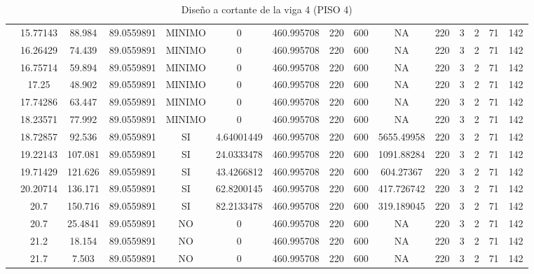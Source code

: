 \begin{table}[H]
{\begin{tabular}{|c|c|c|c|c|c|c|c|c|c|c|c|c|c|c|}
\cline{2-15}    & 15.77143 & 88.984 & 89.0559891 & MINIMO & 0   & 460.995708 & 220 & 600 & NA  & 220 & 3   & 2   & 71  & 142 \bigstrut\\
\cline{2-15}    & 16.26429 & 74.439 & 89.0559891 & MINIMO & 0   & 460.995708 & 220 & 600 & NA  & 220 & 3   & 2   & 71  & 142 \bigstrut\\
\cline{2-15}    & 16.75714 & 59.894 & 89.0559891 & MINIMO & 0   & 460.995708 & 220 & 600 & NA  & 220 & 3   & 2   & 71  & 142 \bigstrut\\
\cline{2-15}    & 17.25 & 48.902 & 89.0559891 & MINIMO & 0   & 460.995708 & 220 & 600 & NA  & 220 & 3   & 2   & 71  & 142 \bigstrut\\
\cline{2-15}    & 17.74286 & 63.447 & 89.0559891 & MINIMO & 0   & 460.995708 & 220 & 600 & NA  & 220 & 3   & 2   & 71  & 142 \bigstrut\\
\cline{2-15}    & 18.23571 & 77.992 & 89.0559891 & MINIMO & 0   & 460.995708 & 220 & 600 & NA  & 220 & 3   & 2   & 71  & 142 \bigstrut\\
\cline{2-15}    & 18.72857 & 92.536 & 89.0559891 & SI  & 4.64001449 & 460.995708 & 220 & 600 & 5655.49958 & 220 & 3   & 2   & 71  & 142 \bigstrut\\
\cline{2-15}    & 19.22143 & 107.081 & 89.0559891 & SI  & 24.0333478 & 460.995708 & 220 & 600 & 1091.88284 & 220 & 3   & 2   & 71  & 142 \bigstrut\\
\cline{2-15}    & 19.71429 & 121.626 & 89.0559891 & SI  & 43.4266812 & 460.995708 & 220 & 600 & 604.27367 & 220 & 3   & 2   & 71  & 142 \bigstrut\\
\cline{2-15}    & 20.20714 & 136.171 & 89.0559891 & SI  & 62.8200145 & 460.995708 & 220 & 600 & 417.726742 & 220 & 3   & 2   & 71  & 142 \bigstrut\\
\cline{2-15}    & 20.7 & 150.716 & 89.0559891 & SI  & 82.2133478 & 460.995708 & 220 & 600 & 319.189045 & 220 & 3   & 2   & 71  & 142 \bigstrut\\
\cline{2-15}    & 20.7 & 25.4841 & 89.0559891 & NO  & 0   & 460.995708 & 220 & 600 & NA  & 220 & 3   & 2   & 71  & 142 \bigstrut\\
\cline{2-15}    & 21.2 & 18.154 & 89.0559891 & NO  & 0   & 460.995708 & 220 & 600 & NA  & 220 & 3   & 2   & 71  & 142 \bigstrut\\
\cline{2-15}    & 21.7 & 7.503 & 89.0559891 & NO  & 0   & 460.995708 & 220 & 600 & NA  & 220 & 3   & 2   & 71  & 142 \bigstrut\\
\hline
\end{tabular}%

  
 
  }%
    \caption{Diseño a cortante de la viga 4 (PISO 4) }
  \label{tab:C VG4 P4 }%
\end{table}%
